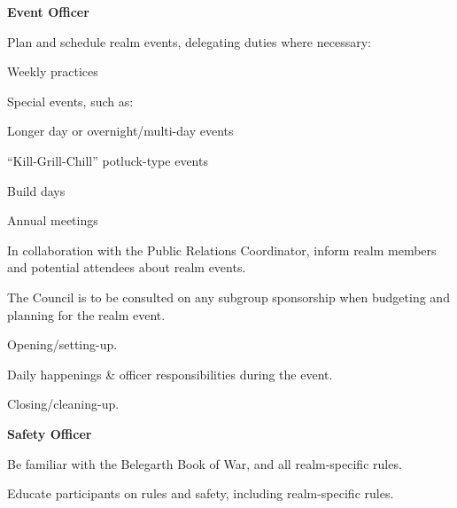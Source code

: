 \documentclass[12pt]{article}
\begin{document}
\begin{level}
\begin{level}
\begin{level}
        \end{level}
        \item \textbf{Event Officer}
        \begin{level}
            \item Plan and schedule realm events, delegating duties where necessary:
            \begin{level}
                \item Weekly practices
                \item Special events, such as:
                \begin{level}
                    \item Longer day or overnight/multi-day events
                    \item “Kill-Grill-Chill” potluck-type events
                \end{level}
                \item Build days
                \item Annual meetings
            \end{level}
            \item In collaboration with the Public Relations Coordinator, inform realm members and potential attendees about realm events.
            \item The Council is to be consulted on any subgroup sponsorship when budgeting and planning for the realm event.
            \item {}
            \item {}
            \begin{level}
                \item Opening/setting-up.
                \item Daily happenings \& officer responsibilities during the event.
                \item Closing/cleaning-up.
            \end{level}
        \end{level}
        \item \textbf{Safety Officer}
        \begin{level}
            \item Be familiar with the Belegarth Book of War, and all realm-specific rules.
            \item Educate participants on rules and safety, including realm-specific rules. 

\end{level}
\end{level}
\end{level}
\end{document}
